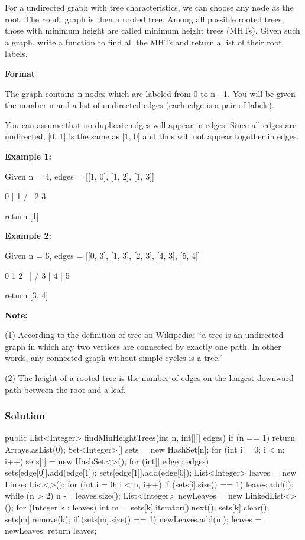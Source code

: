 For a undirected graph with tree characteristics, we can choose any node as the root. The result graph is then a rooted tree. Among all possible rooted trees, those with minimum height are called minimum height trees (MHTs). Given such a graph, write a function to find all the MHTs and return a list of their root labels.

\textbf{Format}

The graph contains n nodes which are labeled from 0 to n - 1. You will be given the number n and a list of undirected edges (each edge is a pair of labels).

You can assume that no duplicate edges will appear in edges. Since all edges are undirected, [0, 1] is the same as [1, 0] and thus will not appear together in edges.

\textbf{Example 1:}

Given n = 4, edges = [[1, 0], [1, 2], [1, 3]]
\begin{Code}
        0
        |
        1
       / \
      2   3
\end{Code}

return [1]

\textbf{Example 2:}

Given n = 6, edges = [[0, 3], [1, 3], [2, 3], [4, 3], [5, 4]]
\begin{Code}
     0  1  2
      \ | /
        3
        |
        4
        |
        5
\end{Code}

return [3, 4]

\textbf{Note:}

(1) According to the definition of tree on Wikipedia: “a tree is an undirected graph in which any two vertices are connected by exactly one path. In other words, any connected graph without simple cycles is a tree.”

(2) The height of a rooted tree is the number of edges on the longest downward path between the root and a leaf.

\newpage

\subsubsection{Solution}

\begin{Code}
public List<Integer> findMinHeightTrees(int n, int[][] edges) {
    if (n == 1) {
        return Arrays.asList(0);
    }
    Set<Integer>[] sets = new HashSet[n];
    for (int i = 0; i < n; i++) {
        sets[i] = new HashSet<>();
    }
    for (int[] edge : edges) {
        sets[edge[0]].add(edge[1]);
        sets[edge[1]].add(edge[0]);
    }
    List<Integer> leaves = new LinkedList<>();
    for (int i = 0; i < n; i++) {
        if (sets[i].size() == 1) {
            leaves.add(i);
        }
    }
    while (n > 2) {
        n -= leaves.size();
        List<Integer> newLeaves = new LinkedList<>();
        for (Integer k : leaves) {
            int m = sets[k].iterator().next();
            sets[k].clear();
            sets[m].remove(k);
            if (sets[m].size() == 1) {
                newLeaves.add(m);
            }
        }
        leaves = newLeaves;
    }
    return leaves;
}
\end{Code}

